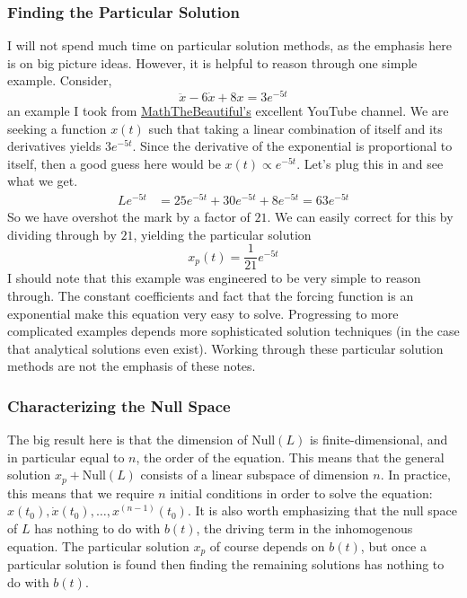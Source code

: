 \documentclass[12pt]{article}
\begin{document}
\subsubsection{Finding the Particular Solution}
I will not spend much time on particular solution methods, as the emphasis here is on big picture ideas. However, it is helpful to reason through one simple example. 
Consider,  
\[\ddot{x} - 6\dot{x} + 8x = 3e^{-5t}\]
an example I took from \href{https://www.youtube.com/watch?v=3eFiwF8pUR4&list=PLlXfTHzgMRUK56vbQgzCVM9vxjKxc8DCr&index=5}{MathTheBeautiful's} excellent 
YouTube channel. We are seeking a function $x(t)$ such that taking a linear combination of itself and its derivatives yields $3e^{-5t}$. Since the derivative of the exponential 
is proportional to itself, then a good guess here would be $x(t) \propto e^{-5t}$. Let's plug this in and see what we get. 
\begin{align*}
L e^{-5t} &= 25e^{-5t} + 30 e^{-5t} + 8 e^{-5t} = 63 e^{-5t}
\end{align*}
So we have overshot the mark by a factor of $21$. We can easily correct for this by dividing through by $21$, yielding the particular solution 
\[x_p(t) = \frac{1}{21} e^{-5t}\]
I should note that this example was engineered to be very simple to reason through. The constant coefficients and fact that the forcing function is an exponential make this 
equation very easy to solve. Progressing to more complicated examples depends more sophisticated solution techniques (in the case that analytical solutions even exist). 
Working through these particular solution methods are not the emphasis of these notes. 

\subsubsection{Characterizing the Null Space}
The big result here is that the dimension of $\text{Null}(L)$ is finite-dimensional, and in particular equal to $n$, the order of the equation. This means that the general solution 
$x_p + \text{Null}(L)$ consists of a linear subspace of dimension $n$. In practice, this means that we require $n$ initial conditions in order to solve the equation: 
$x(t_0), \dot{x}(t_0), \dots, x^{(n-1)}(t_0)$. It is also worth emphasizing that the null space of $L$ has nothing to do with $b(t)$, the driving term in the inhomogenous equation. 
The particular solution $x_p$ of course depends on $b(t)$, but once a particular solution is found then finding the remaining solutions has nothing to do with $b(t)$. 
\end{document}

